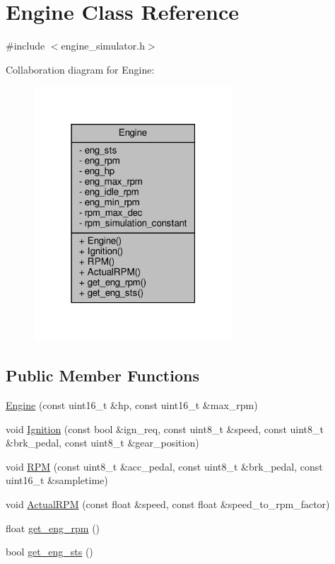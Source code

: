 \hypertarget{classEngine}{}\section{Engine Class Reference}
\label{classEngine}


{\ttfamily \#include $<$engine\+\_\+simulator.\+h$>$}



Collaboration diagram for Engine\+:
\nopagebreak
\begin{figure}[H]
\begin{center}
\leavevmode
\includegraphics[width=211pt]{classEngine__coll__graph}
\end{center}
\end{figure}
\subsection*{Public Member Functions}
\begin{DoxyCompactItemize}
\item 
\hyperlink{classEngine_a756d6abb1d53627a0763f53490a774ef}{Engine} (const uint16\+\_\+t \&hp, const uint16\+\_\+t \&max\+\_\+rpm)
\item 
void \hyperlink{classEngine_a7e4b7cfcb9184beb80fed0ea60a3aad1}{Ignition} (const bool \&ign\+\_\+req, const uint8\+\_\+t \&speed, const uint8\+\_\+t \&brk\+\_\+pedal, const uint8\+\_\+t \&gear\+\_\+position)
\item 
void \hyperlink{classEngine_aaeaf10a957802225b43d088b5c2ce54b}{R\+PM} (const uint8\+\_\+t \&acc\+\_\+pedal, const uint8\+\_\+t \&brk\+\_\+pedal, const uint16\+\_\+t \&sampletime)
\item 
void \hyperlink{classEngine_a72bbd11160a8d916332b26e294133684}{Actual\+R\+PM} (const float \&speed, const float \&speed\+\_\+to\+\_\+rpm\+\_\+factor)
\item 
float \hyperlink{classEngine_a31646756334221f7967a114c64f188f4}{get\+\_\+eng\+\_\+rpm} ()
\item 
bool \hyperlink{classEngine_abf40022906338faef233d44a93ea01af}{get\+\_\+eng\+\_\+sts} ()
\end{DoxyCompactItemize}
